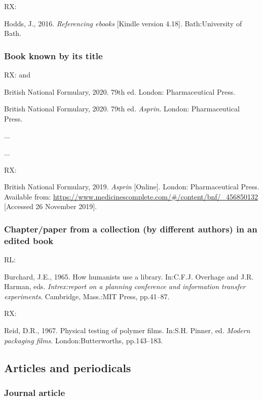 RX: \cite{hodds2016re}

Hodds, J., 2016. \emph{Referencing ebooks} [Kindle version 4.18]. Bath:\@ University of Bath.



\subsubsection*{Book known by its title}

RX: \cite{bnf2020} and \cite{asprin2020bnf}

British National Formulary, 2020. 79th ed. London: Pharmaceutical Press.

British National Formulary, 2020. 79th ed. \emph{Asprin.} London: Pharmaceutical Press.

...


...

RX: \cite{asprin2019bnf}

British National Formulary, 2019. \emph{Asprin} [Online]. London: Pharmaceutical Press. Available from: \url{https://www.medicinescomplete.com/#/content/bnf/_456850132} [Accessed 26 November 2019].



\subsubsection*{Chapter\slash paper from a collection (by different authors) in an edited book}

RL: \cite{burchard1965hhl}

Burchard, J.E., 1965. How humanists use a library. In:\@ C.F.J. Overhage and J.R. Harman, eds. \emph{Intrex:\@ report on a planning conference and information transfer experiments}. Cambridge, Mass.:\@ MIT Press, pp.41--87.


RX: \cite{reid1967ptp}

Reid, D.R., 1967. Physical testing of polymer films. In:\@ S.H. Pinner, ed. \emph{Modern packaging films}. London:\@ Butterworths, pp.143--183.



\subsection{Articles and periodicals}

\subsubsection*{Journal article}

